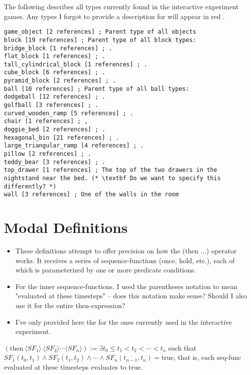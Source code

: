 \documentclass{article}
\begin{document}
            The following describes all types currently found in the interactive experiment games. Any types I forgot to provide a description for will appear in {\color{red}red }.
        
\begin{lstlisting}
game_object [2 references] ; Parent type of all objects
block [19 references] ; Parent type of all block types:
bridge_block [1 references] ; .
flat_block [1 references] ; .
tall_cylindrical_block [1 references] ; .
cube_block [6 references] ; .
pyramid_block [2 references] ; .
ball [10 references] ; Parent type of all ball types:
dodgeball [12 references] ; .
golfball [3 references] ; .
curved_wooden_ramp [5 references] ; .
chair [1 references] ; ,
doggie_bed [2 references] ; .
hexagonal_bin [21 references] ; .
large_triangular_ramp [4 references] ; .
pillow [2 references] ; .
teddy_bear [3 references] ; .
top_drawer [1 references] ; The top of the two drawers in the nightstand near the bed. (* \textbf Do we want to specify this differently? *)
wall [3 references] ; One of the walls in the room
\end{lstlisting}




\section{Modal Definitions}

\begin{itemize}
    \item These definitions attempt to offer precision on how the (then ...) operator works. It receives a series of sequence-functions (once, hold, etc.), each of which is parameterized by one or more predicate conditions. 

    \item For the inner sequence-functions, I used the parentheses notation to mean "evaluated at these timesteps" -- does this notation make sense? Should I also use it for the entire then-expression? 
    
    \item I've only provided here the for the ones currently used in the interactive experiment. 
\end{itemize}

$(\text{then}\ \langle SF_1 \rangle \ \langle SF_2 \rangle \cdots \langle SF_n \rangle) := \exists t_0 \leq t_1 < t_2 < \cdots < t_n$ such that $SF_1(t_0, t_1) \land SF_2(t_1, t_2) \land \cdots \land SF_n(t_{n-1}, t_n) = \text{true}$, that is, each seq-func evaluated at these timesteps evaluates to true. 
\end{document}
